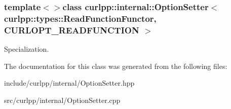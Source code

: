 \subsubsection*{template$<$$>$class curlpp\-::internal\-::\-Option\-Setter$<$ curlpp\-::types\-::\-Read\-Function\-Functor, C\-U\-R\-L\-O\-P\-T\-\_\-\-R\-E\-A\-D\-F\-U\-N\-C\-T\-I\-O\-N $>$}

Specialization. 

The documentation for this class was generated from the following files\-:\begin{DoxyCompactItemize}
\item 
include/curlpp/internal/Option\-Setter.\-hpp\item 
src/curlpp/internal/Option\-Setter.\-cpp\end{DoxyCompactItemize}
